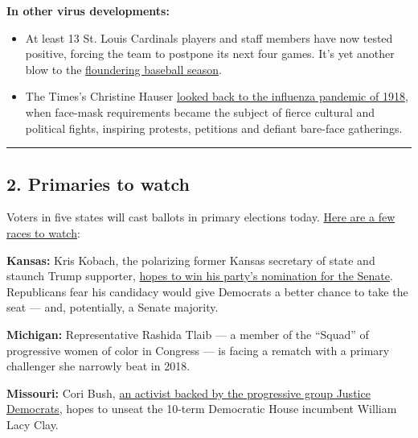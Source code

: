 \textbf{In other virus developments:}

\begin{itemize}
\item
  At least 13 St. Louis Cardinals players and staff members have now
  tested positive, forcing the team to postpone its next four games.
  It's yet another blow to the
  \href{https://www.nytimes3xbfgragh.onion/2020/08/03/sports/baseball/mlb-coronavirus-outbreak.html?action=click\&module=RelatedLinks\&pgtype=Article}{floundering
  baseball season}.
\item
  The Times's Christine Hauser
  \href{https://www.nytimes3xbfgragh.onion/2020/08/03/us/mask-protests-1918.html}{looked
  back to the influenza pandemic of 1918}, when face-mask requirements
  became the subject of fierce cultural and political fights, inspiring
  protests, petitions and defiant bare-face gatherings.
\end{itemize}

\begin{center}\rule{0.5\linewidth}{\linethickness}\end{center}

\hypertarget{2-primaries-to-watch}{%
\subsection{2. Primaries to watch}\label{2-primaries-to-watch}}

Voters in five states will cast ballots in primary elections today.
\href{https://www.nytimes3xbfgragh.onion/2020/08/04/us/elections/primary-election-michigan-arizona-kansas.html}{Here
are a few races to watch}:

\textbf{Kansas:} Kris Kobach, the polarizing former Kansas secretary of
state and staunch Trump supporter,
\href{https://www.nytimes3xbfgragh.onion/2020/08/03/us/politics/kris-kobach-kansas-senate-primary.html}{hopes
to win his party's nomination for the Senate}. Republicans fear his
candidacy would give Democrats a better chance to take the seat --- and,
potentially, a Senate majority.

\textbf{Michigan:} Representative Rashida Tlaib --- a member of the
``Squad'' of progressive women of color in Congress --- is facing a
rematch with a primary challenger she narrowly beat in 2018.

\textbf{Missouri:} Cori Bush,
\href{https://www.nytimes3xbfgragh.onion/2020/08/02/us/politics/cori-bush-william-lacy-clay-missouri.html}{an
activist backed by the progressive group Justice Democrats}, hopes to
unseat the 10-term Democratic House incumbent William Lacy Clay.

